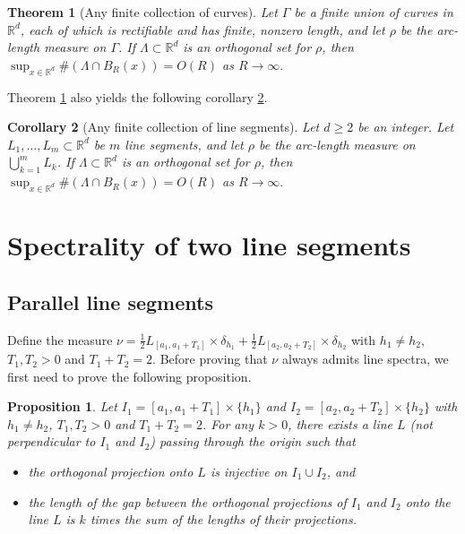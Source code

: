 \documentclass[12pt,a4paper,intlimits,sumlimits]{amsart}
\theoremstyle{plain}
\newtheorem{theorem}{Theorem}
\newtheorem{corollary}[theorem]{Corollary}
\newtheorem{proposition}{Proposition}
\theoremstyle{definition}
\newcounter{rem}
\begin{document}
\begin{theorem}[Any finite collection of curves]\label{curve1}
 Let $\Gamma$ be a finite union of curves in $\mathbb{R}^d$, each of which is rectifiable and has finite, nonzero length, and let $\rho$ be the arc-length measure on $\Gamma$.   If   $\Lambda \subset \mathbb{R}^d$ is an orthogonal set for $\rho $,
then $\sup _{x \in \mathbb{R}^d}\#(\Lambda\cap B_R(x))= O(R)$ as $R\rightarrow\infty.$
\end{theorem}
 Theorem \ref{curve1}  also yields the following corollary \ref{line segment}. 
 

\begin{corollary}[Any finite collection of line segments]\label{line segment}
Let $d \geq 2$ be an integer.
Let $L_1,\dots,L_m \subset \mathbb{R}^d$ be $m$  line segments, and let $\rho $ be the arc-length  measure on $\bigcup_{k=1}^{m} L_k$. If $\Lambda \subset \mathbb{R}^d$ is an orthogonal set for $\rho$, then $\sup _{x \in \mathbb{R}^d}\#(\Lambda\cap B_R(x))= O(R)$ as $R\rightarrow\infty.$
\end{corollary}




\section{Spectrality of two line segments}\label{s:2-segments}
\subsection{Parallel line segments}
Define the measure $\nu=\frac{1}{2}L_{[a_1, a_1+T_1]}\times\delta_{h_1}+\frac{1}{2} L_{[a_2, a_2+T_2]}\times\delta_{h_2}$   with $h_1\neq h_2$, $T_1, T_2>0$ and $T_1+T_2=2$.  Before proving that $\nu$ always admits line spectra, we first need to prove the following proposition.

\begin{proposition}\label{propline}
Let $I_{1}=[a_1, a_1+T_1]\times\{h_1\}$ 
and  $I_{2}=[a_2, a_2+T_2]\times\{h_2\}$ with $h_1\neq h_2$, $T_1, T_2>0$ and $T_1+T_2=2$. 
For any $k>0$,  there exists a line $L$ (not perpendicular to $I_{1}$ and $I_{2}$) passing through the origin
such that
\begin{itemize}
\item [(a)] the orthogonal projection onto $L$ is injective  on $I_1\cup I_2$, and
\item [(b)] the length of the gap between the orthogonal projections of  $I_1$ and $I_2$  onto the line 
 $L$ is $k$ times the sum of the lengths of their projections.
\end{itemize}
\end{proposition}
\end{document}
